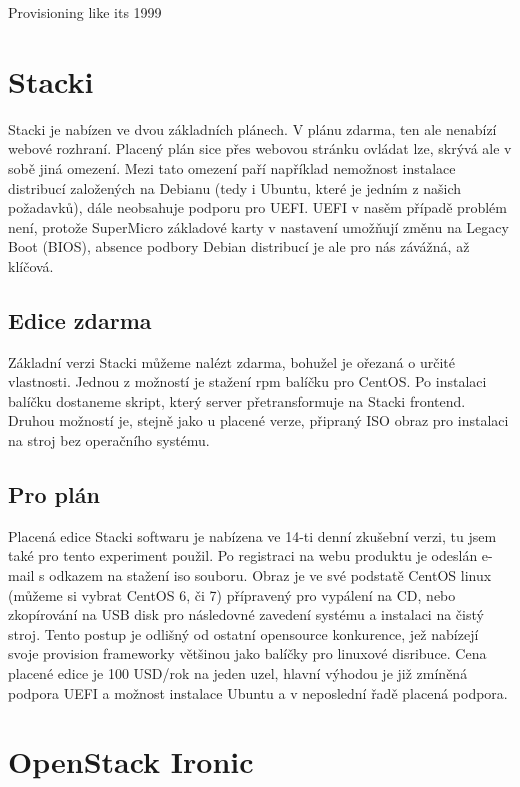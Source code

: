 \documentclass[thesis=B,czech]{FITthesis}[2012/06/26]
\begin{document}
Provisioning like its 1999

\section{Stacki}

Stacki je nabízen ve dvou základních plánech. V plánu zdarma, ten ale nenabízí webové rozhraní. Placený plán sice přes webovou stránku ovládat lze, skrývá ale v sobě jiná omezení. Mezi tato omezení paří například nemožnost instalace distribucí založených na Debianu (tedy i Ubuntu, které je jedním z našich požadavků), dále neobsahuje podporu pro UEFI. UEFI v nasěm případě problém není, protože SuperMicro základové karty v nastavení umožňují změnu na Legacy Boot (BIOS), absence podbory Debian distribucí je ale pro nás závážná, až klíčová.

\subsection{Edice zdarma}

Základní verzi Stacki můžeme nalézt zdarma, bohužel je ořezaná o určité vlastnosti. Jednou z možností je stažení rpm balíčku pro CentOS. Po instalaci balíčku dostaneme skript, který server přetransformuje na Stacki frontend. Druhou možností je, stejně jako u placené verze, připraný ISO obraz pro instalaci na stroj bez operačního systému.

\subsection{Pro plán}

Placená edice Stacki softwaru je nabízena ve 14-ti denní zkušební verzi, tu jsem také pro tento experiment použil. Po registraci na webu produktu je odeslán e-mail s odkazem na stažení iso souboru. Obraz je ve své podstatě CentOS linux (můžeme si vybrat CentOS 6, či 7) přípravený pro vypálení na CD, nebo zkopírování na USB disk pro následovné zavedení systému a instalaci na čistý stroj. Tento postup je odlišný od ostatní opensource konkurence, jež nabízejí svoje provision frameworky většinou jako balíčky pro linuxové disribuce. Cena placené edice je 100 USD/rok na jeden uzel, hlavní výhodou je již zmíněná podpora UEFI a možnost instalace Ubuntu a v neposlední řadě placená podpora.



\section{OpenStack Ironic}
\end{document}
